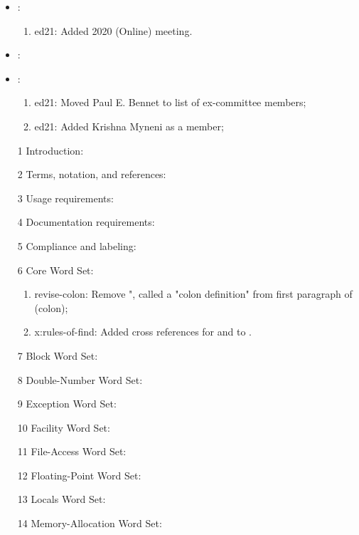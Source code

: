 
	\begin{itemize}
	\item {}:						%
		\begin{enumerate}
			\item \textsf{ed21}: Added 2020 (Online) meeting.
		\end{enumerate}
	\item {}:						%
	\item {}:					%
		\begin{enumerate}
			\item \textsf{ed21}: Moved Paul E. Bennet to list of ex-committee members;
			\item \textsf{ed21}: Added Krishna Myneni as a member;
		\end{enumerate}
	\item[1] Introduction:						%
	\item[2] Terms, notation, and references:	%
	\item[3] Usage requirements:				%
	\item[4] Documentation requirements:	%
	\item[5] Compliance and labeling:		%
	\item[6] Core Word Set:					%
		\begin{enumerate}
		\item \textsf{revise-colon}: Remove ", called a "colon definition" from
			first paragraph of  (colon);
		\item \textsf{x:rules-of-find}: Added cross references for
			 and 
			to .
		\end{enumerate}
	\item[7] Block Word Set:					%
	\item[8] Double-Number Word Set:		%
	\item[9] Exception Word Set:				%
	\item[10] Facility Word Set:				%
	\item[11] File-Access Word Set:			%
	\item[12] Floating-Point Word Set:		%
	\item[13] Locals Word Set:				%
	\item[14] Memory-Allocation Word Set:	%

\end{itemize}
